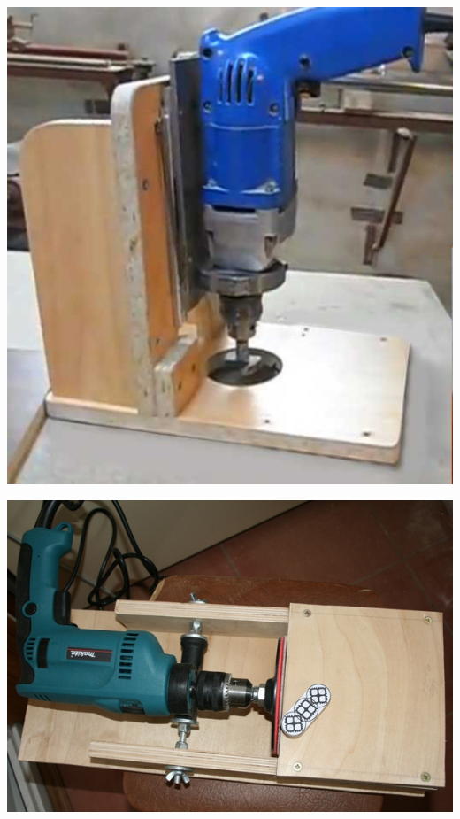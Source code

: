 \documentclass{magazine}
\begin{document}
{\noindent\includegraphics[width=\columnwidth]{fig/00/DrelBoren.jpg}

\noindent\includegraphics[width=\columnwidth]{fig/00/DrelShliph.jpg}

}
\end{document}
